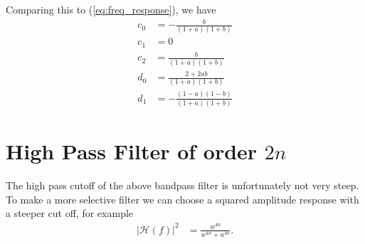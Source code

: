 \documentclass[a4paper]{article}
\begin{document}
Comparing this to (\ref{eq:freq_response}), we have
\begin{align}
c_0 &= -\frac{b}{(1 + a)(1 + b)} \label{eq:c0}\\
c_1 &= 0 \\
c_2 &= \frac{b}{(1 + a)(1 + b)} \\
d_0 &= \frac{2 +2ab}{(1 + a)(1 + b)} \\
d_1 &= -\frac{(1-a)(1-b)}{(1 + a)(1 + b)} \label{eq:d1}
\end{align}

\section{High Pass Filter of order $2 n$}
The high pass cutoff of the above bandpass filter is unfortunately not very
steep.  To make a more selective filter we can choose a squared
amplitude response with a steeper cut off, for example
\begin{align}
    |\mathcal{H}(f)|^2 &= \frac{w^{4n}}{w^{4n} + a^{4n}}.
\end{align}
\end{document}
